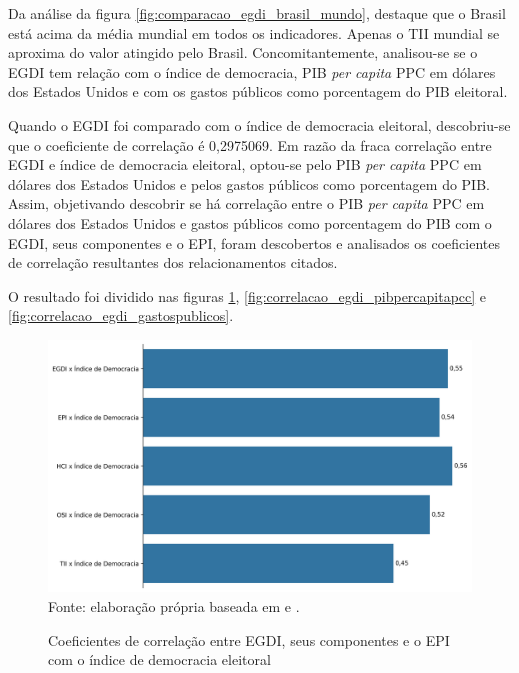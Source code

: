 Da análise da figura \ref{fig:comparacao_egdi_brasil_mundo}, destaque que o Brasil está acima da média mundial em todos os indicadores. Apenas o TII mundial se aproxima do valor atingido pelo Brasil. Concomitantemente, analisou-se se o EGDI tem relação com o índice de democracia, PIB \textit{per capita} PPC em dólares dos Estados Unidos e com os gastos públicos como porcentagem do PIB eleitoral.

Quando o EGDI foi comparado com o índice de democracia eleitoral, descobriu-se que o coeficiente de correlação é 0,2975069. Em razão da fraca correlação entre EGDI e índice de democracia eleitoral, optou-se pelo PIB \textit{per capita} PPC em dólares dos Estados Unidos e pelos gastos públicos como porcentagem do PIB. Assim, objetivando descobrir se há correlação entre o PIB \textit{per capita} PPC em dólares dos Estados Unidos e gastos públicos como porcentagem do PIB com o EGDI, seus componentes e o EPI, foram descobertos e analisados os coeficientes de correlação resultantes dos relacionamentos citados.

O resultado foi dividido nas figuras \ref{fig:correlacao_egdi_indicedemocraciaeleitoral}, \ref{fig:correlacao_egdi_pibpercapitapcc} e \ref{fig:correlacao_egdi_gastospublicos}.

\begin{figure}[H]
	\centering
	\caption{Coeficientes de correlação entre EGDI, seus componentes e o EPI com o índice de democracia eleitoral}
	\includegraphics[width=1\linewidth]{figuras/correlacao_egdi_indicedemocraciaeleitoral.png}
	\label{fig:correlacao_egdi_indicedemocraciaeleitoral}
	\footnotesize{Fonte: elaboração própria baseada em \cite{electoral-democracy-index} e \cite{ONU_EGDI_dados}.}
\end{figure}

